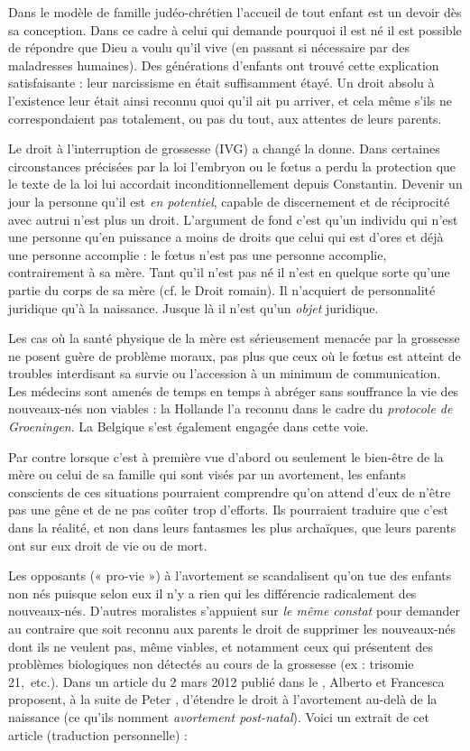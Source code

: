 Dans le modèle de famille judéo-chrétien l'accueil de tout enfant est un devoir dès sa conception. Dans ce cadre à celui qui demande pourquoi il est né il est possible de répondre que Dieu a voulu qu'il vive (en passant si nécessaire par des maladresses humaines). Des générations d'enfants ont trouvé cette explication satisfaisante : leur narcissisme en était suffisamment étayé. Un droit absolu à l'existence leur était ainsi reconnu quoi qu'il ait pu arriver, et cela même s'ils ne correspondaient pas totalement, ou pas du tout, aux attentes de leurs parents.

Le droit à l'interruption de grossesse (IVG) a changé la donne. Dans certaines circonstances précisées par la loi l'embryon ou le fœtus a perdu la protection que le texte de la loi lui accordait inconditionnellement depuis Constantin. Devenir un jour la personne qu'il est \emph{en potentiel}, capable de discernement et de réciprocité avec autrui  n'est plus un droit. L'argument de fond c'est qu'un individu qui n'est une personne qu'en puissance a moins de droits que celui qui est d'ores et déjà une personne accomplie : le fœtus n'est pas une personne accomplie, contrairement à sa mère. Tant qu'il n'est pas né il n'est en quelque sorte qu'une partie du corps de sa mère (cf. le Droit romain). Il n'acquiert de personnalité juridique qu'à la naissance. Jusque là il n'est qu'un \emph{objet} juridique. 

 Les cas où la santé physique de la mère est sérieusement menacée par la grossesse ne posent guère de problème moraux, pas plus que ceux où le fœtus est atteint de troubles interdisant sa survie ou l'accession à un minimum de communication. Les médecins sont amenés de temps en temps à abréger sans souffrance la vie des nouveaux-nés non viables : la Hollande l'a reconnu dans le cadre du \emph{protocole de Groeningen}. La Belgique s'est également engagée dans cette voie. 
 
 Par contre lorsque c'est à première vue d'abord ou seulement le bien-être de la mère ou celui de sa famille qui sont visés par un avortement, les enfants conscients de ces situations pourraient comprendre qu'on attend d'eux de n'être pas une gêne et de ne pas coûter trop d'efforts. Ils pourraient traduire que c'est dans la réalité, et non dans leurs fantasmes les plus archaïques, que leurs parents ont sur eux droit de vie ou de mort.

 Les opposants (« pro-vie ») à l'avortement se scandalisent qu'on tue des enfants non nés puisque selon eux il n'y a rien qui les différencie radicalement des nouveaux-nés. D'autres moralistes s'appuient sur  \emph{le même constat} pour demander au contraire que soit reconnu aux parents le droit de supprimer les nouveaux-nés dont ils ne veulent pas, même viables, et notamment ceux qui présentent des problèmes biologiques non détectés au cours de la grossesse (ex : trisomie 21,~etc.). Dans un article du 2 mars 2012 publié dans le , Alberto  et Francesca  proposent, à la suite de Peter , d'étendre le droit à l'avortement au-delà de la naissance (ce qu'ils nomment \emph{avortement post-natal}). Voici un extrait de cet article (traduction personnelle) :

